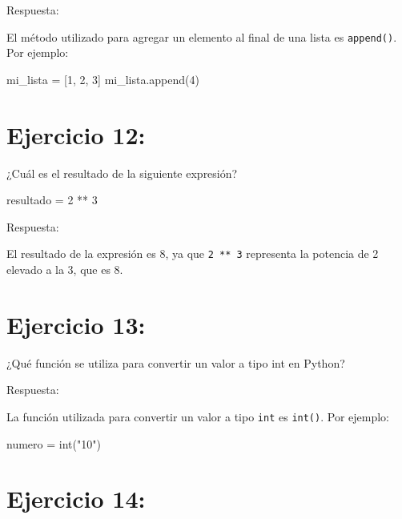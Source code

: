 \documentclass[
  a4paper,
  DIV=11,
  numbers=noendperiod,
  onepage,
  openany]{scrreprt}
\newenvironment{Shaded}{\begin{snugshade}}{\end{snugshade}}
\newcommand{\BuiltInTok}[1]{\textcolor[rgb]{0.00,0.23,0.31}{#1}}
\newcommand{\DecValTok}[1]{\textcolor[rgb]{0.68,0.00,0.00}{#1}}
\newcommand{\NormalTok}[1]{\textcolor[rgb]{0.00,0.23,0.31}{#1}}
\newcommand{\OperatorTok}[1]{\textcolor[rgb]{0.37,0.37,0.37}{#1}}
\newcommand{\StringTok}[1]{\textcolor[rgb]{0.13,0.47,0.30}{#1}}
\begin{document}
Respuesta:

El método utilizado para agregar un elemento al final de una lista es
\texttt{append()}. Por ejemplo:

\begin{Shaded}
\begin{Highlighting}[]
\NormalTok{mi\_lista }\OperatorTok{=}\NormalTok{ [}\DecValTok{1}\NormalTok{, }\DecValTok{2}\NormalTok{, }\DecValTok{3}\NormalTok{]}
\NormalTok{mi\_lista.append(}\DecValTok{4}\NormalTok{)}
\end{Highlighting}
\end{Shaded}

\chapter{Ejercicio 12:}\label{ejercicio-12}

¿Cuál es el resultado de la siguiente expresión?

\begin{Shaded}
\begin{Highlighting}[]
\NormalTok{resultado }\OperatorTok{=} \DecValTok{2} \OperatorTok{**} \DecValTok{3}
\end{Highlighting}
\end{Shaded}

Respuesta:

El resultado de la expresión es 8, ya que \texttt{2\ **\ 3} representa
la potencia de 2 elevado a la 3, que es 8.

\chapter{Ejercicio 13:}\label{ejercicio-13}

¿Qué función se utiliza para convertir un valor a tipo int en Python?

Respuesta:

La función utilizada para convertir un valor a tipo \texttt{int} es
\texttt{int()}. Por ejemplo:

\begin{Shaded}
\begin{Highlighting}[]
\NormalTok{numero }\OperatorTok{=} \BuiltInTok{int}\NormalTok{(}\StringTok{"10"}\NormalTok{)}
\end{Highlighting}
\end{Shaded}

\chapter{Ejercicio 14:}\label{ejercicio-14}
\end{document}
